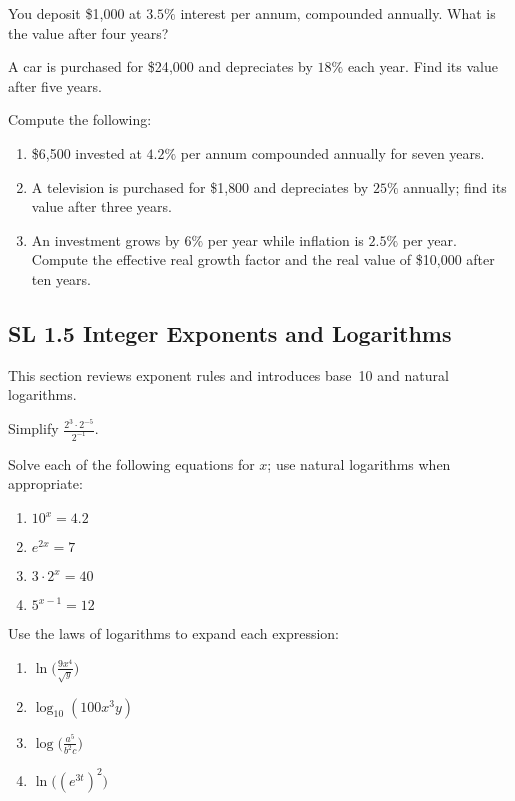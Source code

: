 \documentclass[11pt]{article}
\newcommand{\tocsubsection}[1]{\subsection{#1}}
\newcounter{question}
\begin{document}
\begin{question}
You deposit \$1{,}000 at $3.5\%$ interest per annum, compounded annually.  What
is the value after four years?
\end{question}

\begin{question}
A car is purchased for \$24{,}000 and depreciates by $18\%$ each year.  Find
its value after five years.
\end{question}

\begin{question}
Compute the following:
\begin{enumerate}[label=\alph*)]
\item \$6{,}500 invested at $4.2\%$ per annum compounded annually for seven years.
\item A television is purchased for \$1{,}800 and depreciates by $25\%$ annually;
find its value after three years.
\item An investment grows by $6\%$ per year while inflation is $2.5\%$ per
year.  Compute the effective real growth factor and the real value of
\$10{,}000 after ten years.
\end{enumerate}
\end{question}

\tocsubsection{SL  1.5  \; Integer  Exponents  and  Logarithms}
This section reviews exponent rules and introduces base 10 and natural
logarithms.

\begin{question}
Simplify $\displaystyle\frac{2^3\cdot2^{-5}}{2^{-1}}$.
\end{question}

\begin{question}
Solve each of the following equations for $x$; use natural logarithms when
appropriate:
\begin{enumerate}[label=\alph*)]
\item $10^{x}=4.2$
\item $e^{2x}=7$
\item $3\cdot 2^{x}=40$
\item $5^{x-1}=12$
\end{enumerate}
\end{question}

\begin{question}
Use the laws of logarithms to expand each expression:
\begin{enumerate}[label=\alph*)]
\item $\ln\!\bigl(\tfrac{9x^4}{\sqrt{y}}\bigr)$
\item $\log_{10}(100x^3y)$
\item $\log\!\bigl(\tfrac{a^5}{b^2c}\bigr)$
\item $\ln\!\bigl((e^{3t})^2\bigr)$
\end{enumerate}
\end{question}
\end{document}
